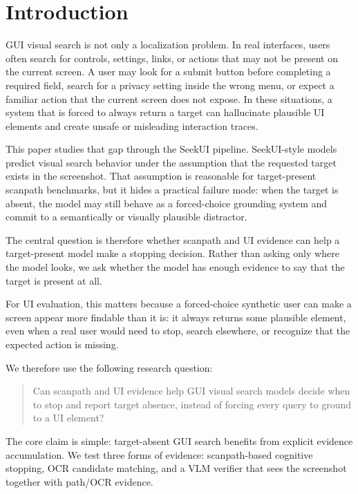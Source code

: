 \section{Introduction}

GUI visual search is not only a localization problem. In real interfaces, users often search for controls, settings, links, or actions that may not be present on the current screen. A user may look for a submit button before completing a required field, search for a privacy setting inside the wrong menu, or expect a familiar action that the current screen does not expose. In these situations, a system that is forced to always return a target can hallucinate plausible UI elements and create unsafe or misleading interaction traces.

This paper studies that gap through the SeekUI pipeline. SeekUI-style models predict visual search behavior under the assumption that the requested target exists in the screenshot. That assumption is reasonable for target-present scanpath benchmarks, but it hides a practical failure mode: when the target is absent, the model may still behave as a forced-choice grounding system and commit to a semantically or visually plausible distractor.

The central question is therefore whether scanpath and UI evidence can help a target-present model make a stopping decision. Rather than asking only where the model looks, we ask whether the model has enough evidence to say that the target is present at all.

For UI evaluation, this matters because a forced-choice synthetic user can make a screen appear more findable than it is: it always returns some plausible element, even when a real user would need to stop, search elsewhere, or recognize that the expected action is missing.

We therefore use the following research question:

\begin{quote}
Can scanpath and UI evidence help GUI visual search models decide when to stop and report target absence, instead of forcing every query to ground to a UI element?
\end{quote}

The core claim is simple: target-absent GUI search benefits from explicit evidence accumulation. We test three forms of evidence: scanpath-based cognitive stopping, OCR candidate matching, and a VLM verifier that sees the screenshot together with path/OCR evidence.

